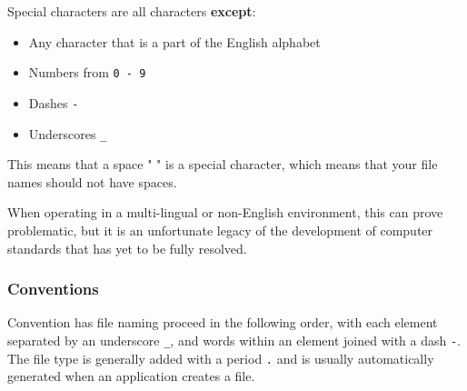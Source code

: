 \documentclass[
]{book}
\providecommand{\tightlist}{%
  \setlength{\itemsep}{0pt}\setlength{\parskip}{0pt}}
\begin{document}
Special characters are all characters \textbf{except}:

\begin{itemize}
\tightlist
\item
  Any character that is a part of the English alphabet
\item
  Numbers from \texttt{0\ -\ 9}
\item
  Dashes \texttt{-}
\item
  Underscores \texttt{\_}
\end{itemize}

This means that a space " " is a special character, which means that your file names should not have spaces.

When operating in a multi-lingual or non-English environment, this can prove problematic, but it is an unfortunate legacy of the development of computer standards that has yet to be fully resolved.

\subsubsection*{Conventions}\label{conventions}

Convention has file naming proceed in the following order, with each element separated by an underscore \texttt{\_}, and words within an element joined with a dash \texttt{-}. The file type is generally added with a period \texttt{.} and is usually automatically generated when an application creates a file.
\end{document}
